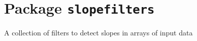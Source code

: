 \chapter{Package \texttt{slopefilters}}

A collection of filters to detect slopes in arrays of input data

\newpage

